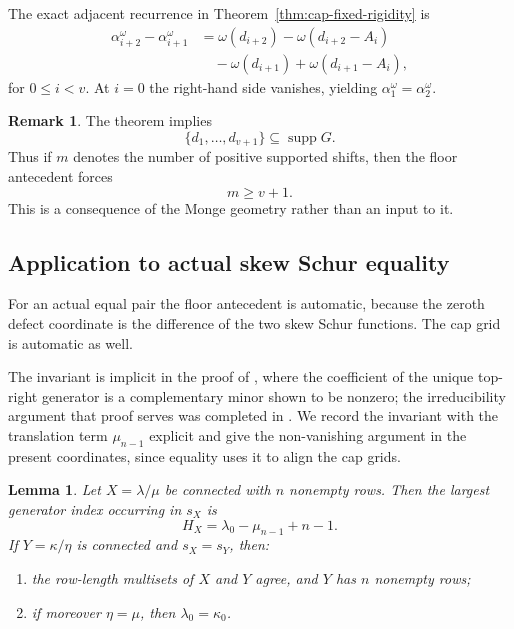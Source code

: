 \documentclass[11pt,a4paper]{amsart}
\numberwithin{equation}{section}
\theoremstyle{plain}
\newtheorem{lemma}[theorem]{Lemma}
\theoremstyle{definition}
\newtheorem{remark}[theorem]{Remark}
\DeclareMathOperator{\supp}{supp}
\begin{document}
The exact adjacent recurrence in Theorem~\ref{thm:cap-fixed-rigidity} is
\[
\begin{aligned}
\alpha_{i+2}^\omega-\alpha_{i+1}^\omega
&=
\omega(d_{i+2})-\omega(d_{i+2}-A_i)\\
&\quad-
\omega(d_{i+1})+\omega(d_{i+1}-A_i),
\end{aligned}
\]
for \(0\le i<v\).  At \(i=0\) the right-hand side vanishes, yielding \(\alpha_1^\omega=\alpha_2^\omega\).

\begin{remark}
The theorem implies
\[
\{d_1,\ldots,d_{v+1}\}\subseteq\supp G.
\]
Thus if \(m\) denotes the number of positive supported shifts, then the floor antecedent forces
\[
m\ge v+1.
\]
This is a consequence of the Monge geometry rather than an input to it.
\end{remark}

\subsection{Application to actual skew Schur equality}\label{subsec:actual-equality}

For an actual equal pair the floor antecedent is automatic, because the zeroth defect coordinate is the difference of the two skew Schur functions.  The cap grid is automatic as well.

The invariant is implicit in the proof of \cite[Cor.~6.3, eq.~(6.1)]{Reiner2007Coincidences}, where the coefficient of the unique top-right generator is a complementary minor shown to be nonzero; the irreducibility argument that proof serves was completed in \cite{Barekat2009CoincidencesCorrigendum}.  We record the invariant with the translation term \(\mu_{n-1}\) explicit and give the non-vanishing argument in the present coordinates, since equality uses it to align the cap grids.

\begin{lemma}\label{lem:equality-normalizes-cap}
Let \(X=\lambda/\mu\) be connected with \(n\) nonempty rows.  Then the largest generator index occurring in \(s_X\) is
\begin{equation}\label{eq:largest-index}
H_X=\lambda_0-\mu_{n-1}+n-1.
\end{equation}
If \(Y=\kappa/\eta\) is connected and \(s_X=s_Y\), then:
\begin{enumerate}[label=(\roman*),leftmargin=2em]
\item the row-length multisets of \(X\) and \(Y\) agree, and \(Y\) has \(n\) nonempty rows;
\item if moreover \(\eta=\mu\), then \(\lambda_0=\kappa_0\).
\end{enumerate}
\end{lemma}
\end{document}
